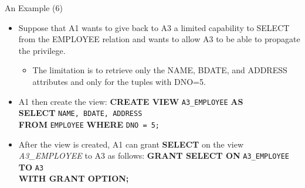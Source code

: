 \begin{frame}{An Example (6)}
    \Large
    \begin{itemize}
        \vspace{-0.5cm}
        \item Suppose that A1 wants to give back to A3 a limited capability to SELECT from the EMPLOYEE relation and wants to allow A3 to be able to propagate the privilege.
        \begin{itemize}
            \large
            \item The limitation is to retrieve only the NAME, BDATE, and ADDRESS attributes and only for the tuples with DNO=5.
        \end{itemize}
        
        \item A1 then create the view:
        \vspace{0.1cm}
        {
            \normalsize
            \textbf{CREATE VIEW} \texttt{A3\_EMPLOYEE} \textbf{AS} \\
            \hspace{0.5cm} \textbf{SELECT} \texttt{NAME, BDATE, ADDRESS} \\
            \hspace{0.5cm} \textbf{FROM} \texttt{EMPLOYEE} \textbf{WHERE} \texttt{DNO = 5;}
        }
        \vspace{0.1cm}
        
        \item After the view is created, A1 can grant \textbf{SELECT} on the view \textit{A3\_EMPLOYEE} to A3 as follows:
        \vspace{0.1cm}
        {
            \normalsize \color{red!70!black}
            \textbf{GRANT SELECT ON} \texttt{A3\_EMPLOYEE} \textbf{TO} \texttt{A3} \\
            \textbf{WITH GRANT OPTION;}
        }
    \end{itemize}
\end{frame}

